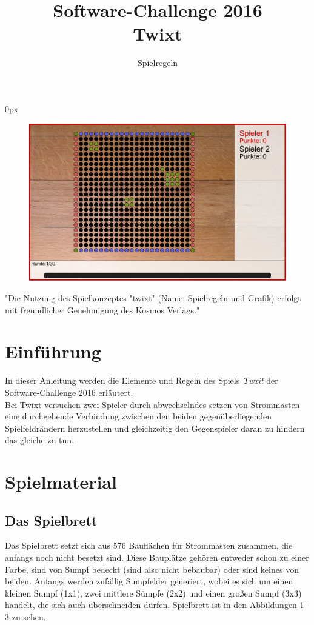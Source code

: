 \documentclass[a4paper, ngerman]{scrartcl}
\title{Software-Challenge 2016 \\ Twixt}
\subtitle{Spielregeln}
\begin{document}
 
\parindent0px
\maketitle

\begin{figure}[h!]
	\centering
	\includegraphics[width=\linewidth]{bilder/gui.png} 
\end{figure}
\vspace*{\fill}
"Die Nutzung des Spielkonzeptes "twixt" (Name, Spielregeln
und Grafik) erfolgt mit freundlicher Genehmigung des Kosmos Verlags."
\newpage
\tableofcontents
\newpage

\section{Einführung}
In dieser Anleitung werden die Elemente und Regeln des Spiels \emph{Twxit} der
Software-Challenge 2016 erläutert.\\
Bei Twixt versuchen zwei Spieler durch abwechselndes setzen von Strommasten eine
durchgehende Verbindung zwischen den beiden gegenüberliegenden Spielfeldrändern
herzustellen und gleichzeitig den Gegenspieler daran zu hindern das gleiche zu
tun. 

\section{Spielmaterial}
	\subsection{Das Spielbrett}
Das Spielbrett setzt sich aus 576 Bauflächen für Strommasten zusammen, die
anfangs noch nicht besetzt sind.
Diese Bauplätze gehören entweder schon zu einer Farbe, sind von Sumpf bedeckt
(sind also nicht bebaubar) oder sind keines von beiden.
Anfangs werden zufällig Sumpfelder generiert, wobei es sich um einen kleinen
Sumpf (1x1), zwei mittlere Sümpfe (2x2) und einen großen Sumpf (3x3) handelt,
die sich auch überschneiden dürfen. Spielbrett ist in den Abbildungen 1-3 zu
sehen.
\end{document}

